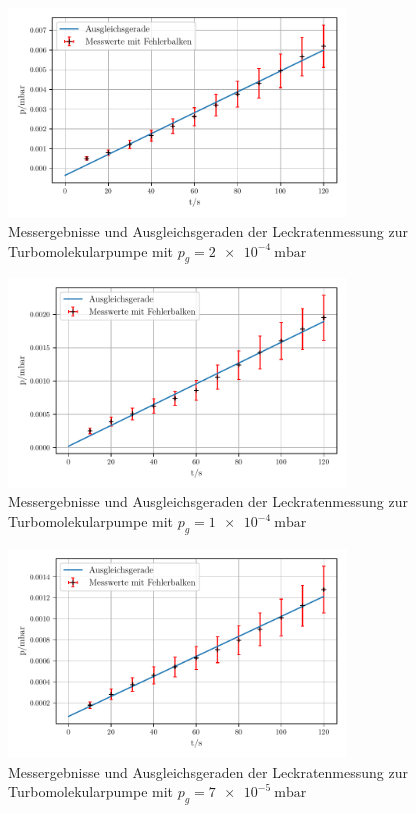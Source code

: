     \begin{figure}
        \centering
        \includegraphics[width=0.8\textwidth]{abb/turbo_leck2e-4.pdf}
        \caption{Messergebnisse und Ausgleichsgeraden der Leckratenmessung zur Turbomolekularpumpe mit $p_g = \qty{2e-4}{\milli\bar}$}
        \label{fig:turboLeck2}
    \end{figure}

    \begin{figure}
        \centering
        \includegraphics[width=0.8\textwidth]{abb/turbo_leck1e-4.pdf}
        \caption{Messergebnisse und Ausgleichsgeraden der Leckratenmessung zur Turbomolekularpumpe mit $p_g = \qty{1e-4}{\milli\bar}$}
        \label{fig:turboLeck1}
    \end{figure}

    \begin{figure}
        \centering
        \includegraphics[width=0.8\textwidth]{abb/turbo_leck7e-5.pdf}
        \caption{Messergebnisse und Ausgleichsgeraden der Leckratenmessung zur Turbomolekularpumpe mit $p_g = \qty{7e-5}{\milli\bar}$}
        \label{fig:turboLeck7}
    \end{figure}

